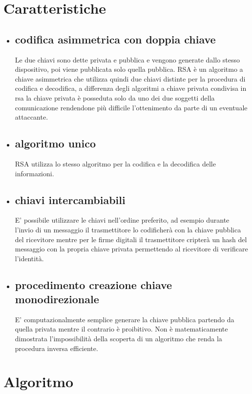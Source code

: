 \begin{itemize}
\section{Caratteristiche}
\begin{itemize}
\item \subsection{codifica asimmetrica con doppia chiave} Le due chiavi sono dette privata e pubblica e vengono generate dallo stesso dispositivo, poi viene pubblicata solo quella pubblica. RSA è un algoritmo a chiave asimmetrica che utilizza quindi due chiavi distinte per la procedura di codifica e decodifica, a differenza degli algoritmi a chiave privata condivisa in rsa la chiave privata è posseduta solo da uno dei due soggetti della comunicazione rendendone più difficile l'ottenimento da parte di un eventuale attaccante.\cite{brunato}
\item \subsection{algoritmo unico}
RSA utilizza lo stesso algoritmo per la codifica e la decodifica delle informazioni.\cite{brunato}
\item \subsection{chiavi intercambiabili}
E' possibile utilizzare le chiavi nell'ordine preferito, ad esempio durante l'invio di un messaggio il trasmettitore lo codificherà con la chiave pubblica del ricevitore mentre per le firme digitali il trasmettitore cripterà un hash del messaggio con la propria chiave privata permettendo al ricevitore di verificare l'identità.\cite{brunato}
\item \subsection{procedimento creazione chiave monodirezionale} E' computazionalmente semplice generare la chiave pubblica partendo da quella privata mentre il contrario è proibitivo. Non è matematicamente dimostrata l'impossibilità della scoperta di un algoritmo che renda la procedura inversa efficiente.\cite{brunato}
\end{itemize}

\section{Algoritmo} 

\end{itemize}
